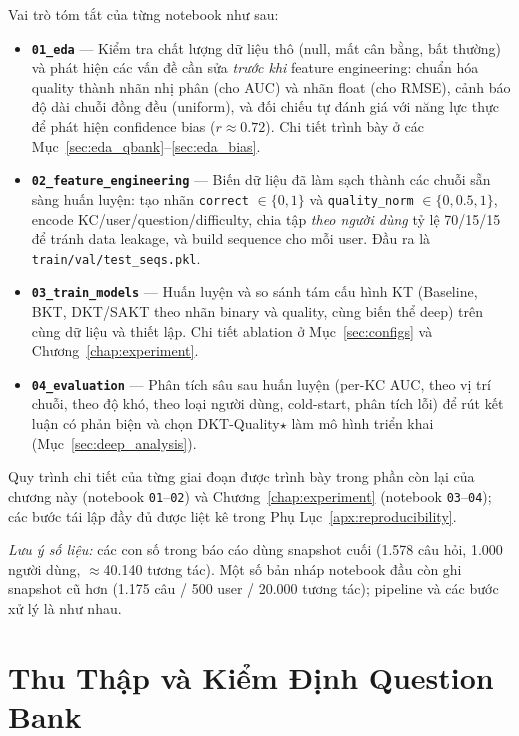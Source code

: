 Vai trò tóm tắt của từng notebook như sau:

\begin{itemize}
  \item \textbf{\texttt{01\_eda}} --- Kiểm tra chất lượng dữ liệu thô (null, mất cân bằng, bất thường) và phát hiện các vấn đề cần sửa \emph{trước khi} feature engineering: chuẩn hóa quality thành nhãn nhị phân (cho AUC) và nhãn float (cho RMSE), cảnh báo độ dài chuỗi đồng đều (uniform), và đối chiếu tự đánh giá với năng lực thực để phát hiện confidence bias ($r \approx 0.72$). Chi tiết trình bày ở các Mục~\ref{sec:eda_qbank}--\ref{sec:eda_bias}.
  \item \textbf{\texttt{02\_feature\_engineering}} --- Biến dữ liệu đã làm sạch thành các chuỗi sẵn sàng huấn luyện: tạo nhãn \texttt{correct} $\in\{0,1\}$ và \texttt{quality\_norm} $\in\{0,0.5,1\}$, encode KC/user/question/difficulty, chia tập \emph{theo người dùng} tỷ lệ 70/15/15 để tránh data leakage, và build sequence cho mỗi user. Đầu ra là \texttt{train/val/test\_seqs.pkl}.
  \item \textbf{\texttt{03\_train\_models}} --- Huấn luyện và so sánh tám cấu hình KT (Baseline, BKT, DKT/SAKT theo nhãn binary và quality, cùng biến thể deep) trên cùng dữ liệu và thiết lập. Chi tiết ablation ở Mục~\ref{sec:configs} và Chương~\ref{chap:experiment}.
  \item \textbf{\texttt{04\_evaluation}} --- Phân tích sâu sau huấn luyện (per-KC AUC, theo vị trí chuỗi, theo độ khó, theo loại người dùng, cold-start, phân tích lỗi) để rút kết luận có phản biện và chọn DKT-Quality$\star$ làm mô hình triển khai (Mục~\ref{sec:deep_analysis}).
\end{itemize}

Quy trình chi tiết của từng giai đoạn được trình bày trong phần còn lại của chương này (notebook \texttt{01}--\texttt{02}) và Chương~\ref{chap:experiment} (notebook \texttt{03}--\texttt{04}); các bước tái lập đầy đủ được liệt kê trong Phụ Lục~\ref{apx:reproducibility}.

\medskip
\noindent\textit{Lưu ý số liệu:} các con số trong báo cáo dùng snapshot cuối (1.578 câu hỏi, 1.000 người dùng, $\approx$40.140 tương tác). Một số bản nháp notebook đầu còn ghi snapshot cũ hơn (1.175 câu / 500 user / 20.000 tương tác); pipeline và các bước xử lý là như nhau.

\section{Thu Thập và Kiểm Định Question Bank}
\label{sec:qbank_build}

